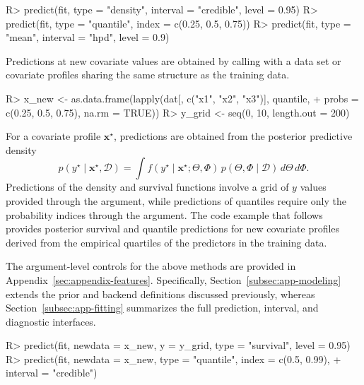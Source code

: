 \documentclass[11pt]{article}\usepackage[]{graphicx}\usepackage[]{xcolor}
\newcommand{\code}[1]{\texttt{\detokenize{#1}}}
\renewenvironment{Schunk}{\vspace{0pt}}{\vspace{-0.1\baselineskip}}
\begin{document}
\begin{Schunk}
\begin{Sinput}
R> predict(fit, type = "density", interval = "credible", level = 0.95)
R> predict(fit, type = "quantile", index = c(0.25, 0.5, 0.75))
R> predict(fit, type = "mean", interval = "hpd", level = 0.9)
\end{Sinput}
\end{Schunk}

Predictions at new covariate values are obtained by calling
\code{predict()} with a data set or covariate profiles sharing the
same structure as the training data.

\begin{Schunk}
\begin{Sinput}
R> x_new <- as.data.frame(lapply(dat[, c("x1", "x2", "x3")], quantile,
+                  probs = c(0.25, 0.5, 0.75), na.rm = TRUE))
R> y_grid <- seq(0, 10, length.out = 200)
\end{Sinput}
\end{Schunk}

For a covariate profile $\boldsymbol{x}^\star$, predictions are obtained from the
posterior predictive density
\begin{equation*}
p(y^\star\mid \boldsymbol{x}^\star, \mathcal{D})
=\int f(y^\star\mid \boldsymbol{x}^\star; \Theta, \Phi)\,p(\Theta, \Phi\mid \mathcal{D})\,d\Theta\,d\Phi.
\end{equation*}
Predictions of the density and survival functions involve a grid of $y$
values provided through the \code{y} argument, while predictions of quantiles
require only the probability indices through the \code{index} argument.
The code example that follows provides posterior survival and quantile
predictions for new covariate profiles derived from the empirical
quartiles of the predictors in the training data.

The argument-level controls for the above methods are provided in
Appendix~\ref{sec:appendix-features}. Specifically,
Section~\ref{subsec:app-modeling} extends the prior and backend
definitions discussed previously, whereas Section~\ref{subsec:app-fitting} summarizes the full prediction,
interval, and diagnostic interfaces.

\begin{Schunk}
\begin{Sinput}
R> predict(fit, newdata = x_new, y = y_grid, type = "survival", level = 0.95)
R> predict(fit, newdata = x_new, type = "quantile", index = c(0.5, 0.99),
+                             interval = "credible")
\end{Sinput}
\end{Schunk}
\end{document}
